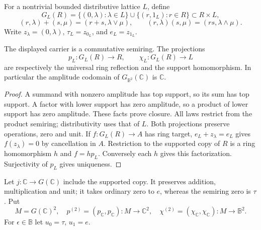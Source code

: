 For a nontrivial bounded distributive lattice $L$, define
\[
G_L(R)=\{(0,\lambda):\lambda\in L\}\cup\{(r,1_L):r\in R\}\subset R\times L,
\]
\[
(r,\lambda)+(s,\mu)=(r+s,\lambda\vee\mu),\qquad
(r,\lambda)(s,\mu)=(rs,\lambda\wedge\mu).
\]
Write $z_\lambda=(0,\lambda)$, $\tau_L=z_{0_L}$, and $e_L=z_{1_L}$.

\begin{proposition}
\label{prop:sz-lattice-reflection}
The displayed carrier is a commutative semiring. The projections
\[
p_L:G_L(R)\to R,\qquad \chi_L:G_L(R)\to L
\]
are respectively the universal ring reflection and the support homomorphism. In particular the amplitude codomain of $G_{\mathbb B^2}(\mathbb C)$ is $\mathbb C$.
\end{proposition}
\begin{proof}
A summand with nonzero amplitude has top support, so its sum has top support. A factor with lower support has zero amplitude, so a product of lower support has zero amplitude. These facts prove closure. All laws restrict from the product semiring; distributivity uses that of $L$. Both projections preserve operations, zero and unit. If $f:G_L(R)\to A$ has ring target, $e_L+z_\lambda=e_L$ gives $f(z_\lambda)=0$ by cancellation in $A$. Restriction to the supported copy of $R$ is a ring homomorphism $h$ and $f=h p_L$. Conversely each $h$ gives this factorization. Surjectivity of $p_L$ gives uniqueness.
\end{proof}

Let $j:\mathbb C\to G(\mathbb C)$ include the supported copy. It preserves addition, multiplication and unit; it takes ordinary zero to $e$, whereas the semiring zero is $\tau$. Put
\[
M=G(\mathbb C)^2,\quad
p^{(2)}=(p_{\mathbb C},p_{\mathbb C}):M\to\mathbb C^2,\quad
\chi^{(2)}=(\chi_{\mathbb C},\chi_{\mathbb C}):M\to\mathbb B^2.
\]
For $\epsilon\in\mathbb B$ let $u_0=\tau$, $u_1=e$.

